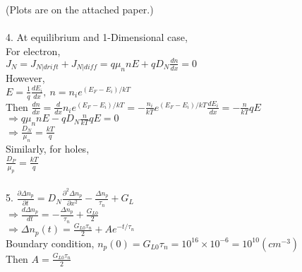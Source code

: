 \documentclass[11pt,oneside,a4paper]{article}
\begin{document}
\hspace{8.5mm} (Plots are on the attached paper.) \\
\\

4.\: At equilibrium and 1-Dimensional case, \\

\quad\:  For electron, \\

\hspace{8.5mm} \(J_N=J_{N|drift}+J_{N|diff}=q\mu_nnE+qD_N\frac{dn}{dx}=0\) \\

\quad\: However, \\

\hspace{8.5mm} \(E=\frac{1}{q}\frac{dE_i}{dx},\ n=n_ie^{(E_F-E_i)/kT}\) \\

\quad\: Then \(\frac{dn}{dx}=\frac{d}{dx}n_ie^{(E_F-E_i)/kT}=-\frac{n_i}{kT}e^{(E_F-E_i)/kT}\frac{dE_i}{dx}=-\frac{n}{kT}qE\) \\

\hspace{8.5mm} \(\Rightarrow q\mu_nnE-qD_N\frac{n}{kT}qE=0\) \\

\hspace{8.5mm} \(\Rightarrow\frac{D_N}{\mu_n}=\frac{kT}{q}\) \\

\quad\: Similarly, for holes, \\

\hspace{8.5mm} \(\frac{D_P}{\mu_p}=\frac{kT}{q}\) \\
\\

5.\: \(\frac{\partial\Delta n_p}{\partial t}=D_N\frac{\partial^2\Delta n_p}{\partial x^2}-\frac{\Delta n_p}{\tau_n}+G_L\) \\

\quad\: \(\Rightarrow\frac{d\Delta n_p}{dt}=-\frac{\Delta n_p}{\tau_n}+\frac{G_{L0}}{2}\) \\

\quad\: \(\Rightarrow\Delta n_p(t)=\frac{G_{L0}\tau_n}{2}+Ae^{-t/\tau_n}\) \\

\quad\: Boundary condition, \(n_p(0)=G_{L0}\tau_n=10^{16}\times10^{-6}=10^{10} (cm^{-3})\) \\

\quad\: Then \(A=\frac{G_{L0}\tau_n}{2}\) \\
\end{document}

